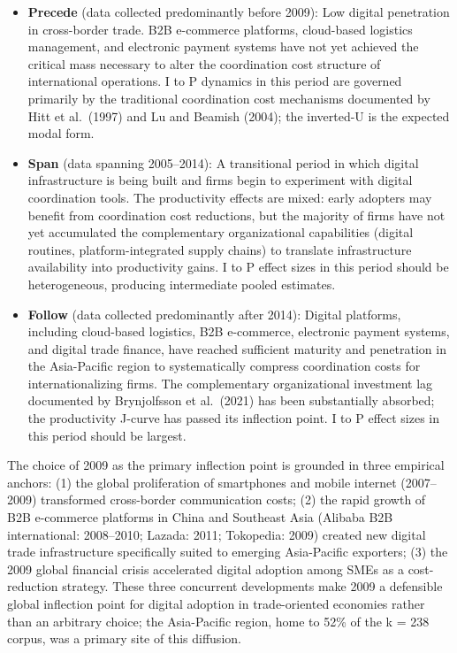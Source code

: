 \documentclass[
  12pt,a4paper]{article}
\providecommand{\tightlist}{%
  \setlength{\itemsep}{0pt}\setlength{\parskip}{0pt}}
\begin{document}
\begin{itemize}
\tightlist
\item
  \textbf{Precede} (data collected predominantly before 2009): Low
  digital penetration in cross-border trade. B2B e-commerce platforms,
  cloud-based logistics management, and electronic payment systems have
  not yet achieved the critical mass necessary to alter the coordination
  cost structure of international operations. I to P dynamics in this
  period are governed primarily by the traditional coordination cost
  mechanisms documented by Hitt et al.~(1997) and Lu and Beamish (2004);
  the inverted-U is the expected modal form.
\item
  \textbf{Span} (data spanning 2005--2014): A transitional period in
  which digital infrastructure is being built and firms begin to
  experiment with digital coordination tools. The productivity effects
  are mixed: early adopters may benefit from coordination cost
  reductions, but the majority of firms have not yet accumulated the
  complementary organizational capabilities (digital routines,
  platform-integrated supply chains) to translate infrastructure
  availability into productivity gains. I to P effect sizes in this
  period should be heterogeneous, producing intermediate pooled
  estimates.
\item
  \textbf{Follow} (data collected predominantly after 2014): Digital
  platforms, including cloud-based logistics, B2B e-commerce, electronic
  payment systems, and digital trade finance, have reached sufficient
  maturity and penetration in the Asia-Pacific region to systematically
  compress coordination costs for internationalizing firms. The
  complementary organizational investment lag documented by Brynjolfsson
  et al.~(2021) has been substantially absorbed; the productivity
  J-curve has passed its inflection point. I to P effect sizes in this
  period should be largest.
\end{itemize}

The choice of 2009 as the primary inflection point is grounded in three
empirical anchors: (1) the global proliferation of smartphones and
mobile internet (2007--2009) transformed cross-border communication
costs; (2) the rapid growth of B2B e-commerce platforms in China and
Southeast Asia (Alibaba B2B international: 2008--2010; Lazada: 2011;
Tokopedia: 2009) created new digital trade infrastructure specifically
suited to emerging Asia-Pacific exporters; (3) the 2009 global financial
crisis accelerated digital adoption among SMEs as a cost-reduction
strategy. These three concurrent developments make 2009 a defensible
global inflection point for digital adoption in trade-oriented economies
rather than an arbitrary choice; the Asia-Pacific region, home to 52\%
of the k = 238 corpus, was a primary site of this diffusion.
\end{document}
